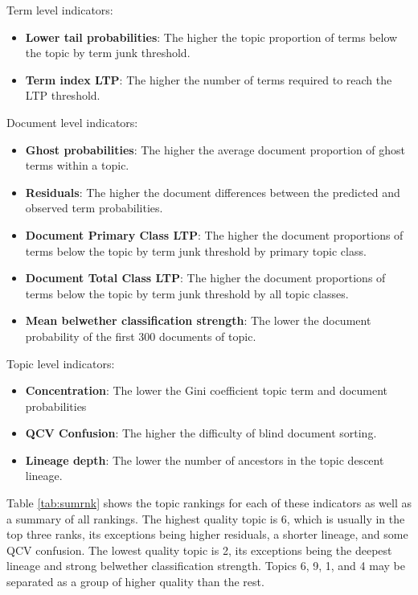 \documentclass[]{book}
\providecommand{\tightlist}{%
  \setlength{\itemsep}{0pt}\setlength{\parskip}{0pt}}
\theoremstyle{definition}
\theoremstyle{definition}
\theoremstyle{definition}
\theoremstyle{remark}
\begin{document}
Term level indicators:

\begin{itemize}
\tightlist
\item
  \textbf{Lower tail probabilities}: The higher the topic proportion of
  terms below the topic by term junk threshold.
\item
  \textbf{Term index LTP}: The higher the number of terms required to
  reach the LTP threshold.
\end{itemize}

Document level indicators:

\begin{itemize}
\tightlist
\item
  \textbf{Ghost probabilities}: The higher the average document
  proportion of ghost terms within a topic.
\item
  \textbf{Residuals}: The higher the document differences between the
  predicted and observed term probabilities.
\item
  \textbf{Document Primary Class LTP}: The higher the document
  proportions of terms below the topic by term junk threshold by primary
  topic class.
\item
  \textbf{Document Total Class LTP}: The higher the document proportions
  of terms below the topic by term junk threshold by all topic classes.
\item
  \textbf{Mean belwether classification strength}: The lower the
  document probability of the first 300 documents of topic.
\end{itemize}

Topic level indicators:

\begin{itemize}
\tightlist
\item
  \textbf{Concentration}: The lower the Gini coefficient topic term and
  document probabilities
\item
  \textbf{QCV Confusion}: The higher the difficulty of blind document
  sorting.
\item
  \textbf{Lineage depth}: The lower the number of ancestors in the topic
  descent lineage.
\end{itemize}

Table \ref{tab:sumrnk} shows the topic rankings for each of these
indicators as well as a summary of all rankings. The highest quality
topic is 6, which is usually in the top three ranks, its exceptions
being higher residuals, a shorter lineage, and some QCV confusion. The
lowest quality topic is 2, its exceptions being the deepest lineage and
strong belwether classification strength. Topics 6, 9, 1, and 4 may be
separated as a group of higher quality than the rest.
\end{document}
